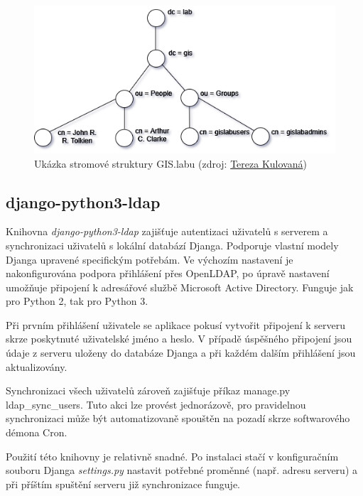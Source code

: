 \begin{figure}[H] \centering
      \includegraphics[width=400pt]{./pictures/gislab-ldap_dit.png}
      \caption[Ukázka stromové struktury GIS.labu]{Ukázka stromové struktury GIS.labu (zdroj:
	  \href{}{Tereza Kulovaná})}
      \label{fig:gislab-dit}
\end{figure}

\subsection{django-python3-ldap}
Knihovna \textit{django-python3-ldap} zajišťuje autentizaci uživatelů s  serverem a synchronizaci  uživatelů s lokální databází Djanga. Podporuje vlastní modely Djanga upravené specifickým potřebám. Ve výchozím nastavení je nakonfigurována podpora přihlášení přes OpenLDAP, po úpravě nastavení umožňuje připojení k adresářové službě Microsoft Active Directory. Funguje jak pro Python 2, tak pro Python 3.

Při prvním přihlášení uživatele se aplikace pokusí vytvořit připojení k  serveru skrze poskytnuté uživatelské jméno a heslo. V případě úspěšného připojení jsou údaje z  serveru uloženy do databáze Djanga a při každém dalším přihlášení jsou aktualizovány. 

Synchronizaci všech uživatelů zároveň zajišťuje příkaz \textsf{manage.py ldap\_sync\_users}. Tuto akci lze provést jednorázově, pro pravidelnou synchronizaci může být automatizovaně spouštěn na pozadí skrze softwarového démona Cron.

Použití této knihovny je relativně snadné. Po instalaci stačí v konfiguračním souboru Djanga \textit{settings.py} nastavit potřebné proměnné (např.  adresu  serveru) a při příštím spuštění serveru již synchronizace funguje. 

